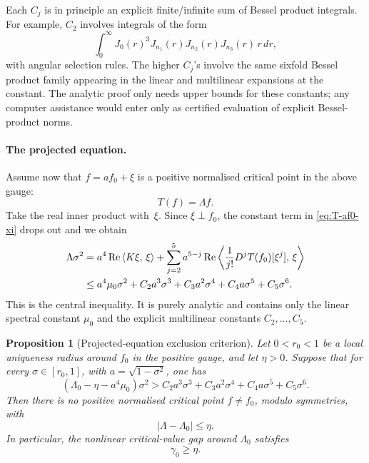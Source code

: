 \documentclass[12pt]{article}
\newtheorem{proposition}[theorem]{Proposition}
\theoremstyle{definition}
\theoremstyle{remark}
\newcommand{\ip}[2]{\left\langle #1,\, #2\right\rangle}
\newcommand{\re}{\operatorname{Re}}
\begin{document}
Each \(C_j\) is in principle an explicit finite/infinite sum of Bessel
product integrals.  For example, \(C_2\) involves integrals of the form
\[
  \int_0^\infty J_0(r)^3J_{n_1}(r)J_{n_2}(r)J_{n_3}(r)\,r\,dr,
\]
with angular selection rules.  The higher \(C_j\)'s involve the same
sixfold Bessel product family appearing in the linear and multilinear
expansions at the constant.  The analytic proof only needs upper bounds
for these constants; any computer assistance would enter only as
certified evaluation of explicit Bessel-product norms.

\paragraph{The projected equation.}
Assume now that \(f=af_0+\xi\) is a positive normalised critical point in
the above gauge:
\[
  T(f)=\Lambda f.
\]
Take the real inner product with~\(\xi\).  Since \(\xi\perp f_0\), the
constant term in \eqref{eq:T-af0-xi} drops out and we obtain
\begin{align}
  \Lambda\sigma^2
  &=
  a^4\re\ip{K\xi}{\xi}
  +
  \sum_{j=2}^{5}a^{5-j}
  \re\ip{\frac1{j!}D^jT(f_0)[\xi^j]}{\xi}
  \notag\\
  &\leq
  a^4\mu_0\sigma^2
  +
  C_2a^3\sigma^3
  +
  C_3a^2\sigma^4
  +
  C_4a\sigma^5
  +
  C_5\sigma^6.
  \label{eq:projected-master-ineq}
\end{align}
This is the central inequality.  It is purely analytic and contains only
the linear spectral constant \(\mu_0\) and the explicit multilinear
constants \(C_2,\ldots,C_5\).

\begin{proposition}[Projected-equation exclusion criterion]
  \label{prop:projected-exclusion}
  Let \(0<r_0<1\) be a local uniqueness radius around \(f_0\) in the
  positive gauge, and let \(\eta>0\).  Suppose that for every
  \(\sigma\in[r_0,1]\), with \(a=\sqrt{1-\sigma^2}\), one has
  \begin{equation}\label{eq:projected-exclusion-criterion}
    (\Lambda_0-\eta-a^4\mu_0)\sigma^2
    >
    C_2a^3\sigma^3
    +C_3a^2\sigma^4
    +C_4a\sigma^5
    +C_5\sigma^6 .
  \end{equation}
  Then there is no positive normalised critical point \(f\neq f_0\),
  modulo symmetries, with
  \[
    |\Lambda-\Lambda_0|\leq\eta.
  \]
  In particular, the nonlinear critical-value gap around \(\Lambda_0\)
  satisfies
  \[
    \gamma_0\geq\eta.
  \]
\end{proposition}
\end{document}
